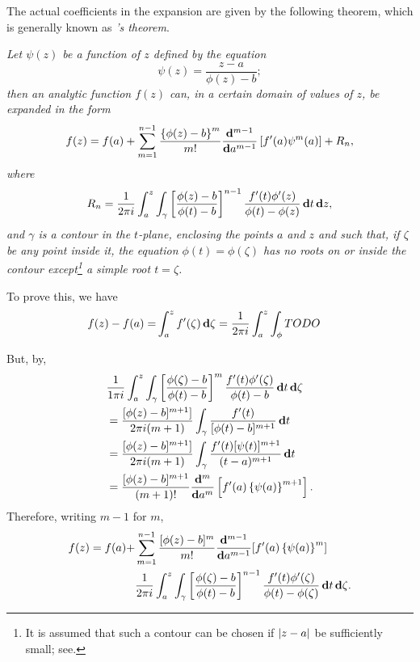The actual coefficients in the expansion are given by the following
theorem, which is generally known as \emph{\Burmann's theorem}.

\emph{Let $\psi(z)$ be a function of $z$ defined by the equation 
$$
\psi(z) = \frac{z-a}{ \phi(z) - b };
$$
then an analytic function $f(z)$ can, in a certain domain of values of
$z$, be expanded in the form
$$
f(z)
=
f(a)
+
\sum_{m=1}^{n-1}
\frac{ \left\{ \phi(z)-b \right\}^{m} }{m!}
\frac{\mathbf{d}^{m-1}}{\mathbf{d} a^{m-1}}
\left[ 
  f'(a) \psi^{m}(a)
 \right]
+
R_{n},
$$
where
$$
R_{n}
=
\frac{1}{2 \pi i}
\int_{a}^{z}
\int_{\gamma}
\left[ 
  \frac{\phi(z) - b}{\phi(t) - b}
 \right]^{n-1}
\frac{ f'(t) \phi'(z) }{\phi(t) - \phi(z)}
\, \mathbf{d} t \, \mathbf{d} z,
$$
and $\gamma$ is a contour in the $t$-plane, enclosing the points $a$
and $z$ and such that, if $\zeta$ be any point inside it, the equation
$\phi(t) = \phi(\zeta)$ has no roots on or inside the contour
except\footnote{It is assumed that such a contour can be chosen if
  $\left| z - a \right|$ be sufficiently small;
  see.} a simple root $t=\zeta$.
}

To prove this, we have
\begin{align*}
  f(z) - f(a)
  = &
  \int_{a}^{z} f'(\zeta) \, \mathbf{d} \zeta
  = \frac{1}{2 \pi i} \int_{a}^{z} \int_{\phi} TODO
\end{align*}

%
%

But, by,
\begin{align*}
  &
  \frac{1}{1 \pi i}
  \int_{a}^{z} \int_{\gamma}
  \left[  \frac{\phi(\zeta) - b}{\phi(t) - b}  \right]^{m}
  \frac{f'(t)\phi'(\zeta)}{\phi(t) - b}
  \, \mathbf{d} t \, \mathbf{d} \zeta
  \\
  &=
  \frac{ [\phi(z) - b]^{m+1}] }{2 \pi i (m+1)}
  \int_{\gamma} \frac{f'(t)}{[\phi(t) - b]^{m+1}} \, \mathbf{d} t
  \\
  &=
  \frac{ [\phi(z) - b]^{m+1}] }{2 \pi i (m+1)}
  \int_{\gamma}
  \frac{ f'(t) [\psi(t)]^{m+1} }{ (t-a)^{m+1} }
  \, \mathbf{d} t
  \\
  &=
  \frac{ [\phi(z) - b ]^{m+1} }{ (m+1)! }
  \frac{ \mathbf{d}^{m} }{ \mathbf{d} a^{m} }
  \left[  f'(a) \left\{ \psi(a) \right\}^{m+1}  \right].
\end{align*}
Therefore, writing
$m - 1$ for $m$,
\begin{align*}
  f(z) = f(a) +
  &
  \sum_{m=1}^{n-1}
  \frac{ [\phi(z) - b]^{m} }{m!}
  \frac{\mathbf{d}^{m-1}}{\mathbf{d} a^{m-1}}
  [ f'(a) \left\{  \psi(a)  \right\}^{m} ]
  \\
  &
  \frac{1}{2 \pi i}
  \int_{a}^{z} \int_{\gamma}
  \left[ 
    \frac{\phi(\zeta) - b}{\phi(t) - b}
   \right]^{n-1}
  \frac{f'(t) \phi'(\zeta)}{\phi(t) - \phi(\zeta)}
  \, \mathbf{d} t \, \mathbf{d} \zeta.
\end{align*}

